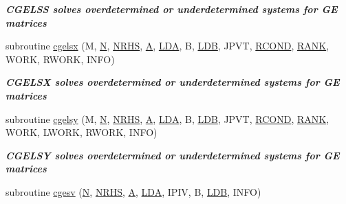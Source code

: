 \begin{DoxyCompactItemize}
\begin{DoxyCompactList}\small\item\em {\bfseries  C\+G\+E\+L\+S\+S solves overdetermined or underdetermined systems for G\+E matrices} \end{DoxyCompactList}\item 
subroutine \hyperlink{group__complexGEsolve_ga3c220cf53bd0e63da90633205a6b1db2}{cgelsx} (M, \hyperlink{polmisc_8c_a0240ac851181b84ac374872dc5434ee4}{N}, \hyperlink{example__user_8c_aa0138da002ce2a90360df2f521eb3198}{N\+R\+H\+S}, \hyperlink{classA}{A}, \hyperlink{example__user_8c_ae946da542ce0db94dced19b2ecefd1aa}{L\+D\+A}, B, \hyperlink{example__user_8c_a50e90a7104df172b5a89a06c47fcca04}{L\+D\+B}, J\+P\+V\+T, \hyperlink{superlu__enum__consts_8h_af00a42ecad444bbda75cde1b64bd7e72a9b5c151728d8512307565994c89919d5}{R\+C\+O\+N\+D}, \hyperlink{splinemodule_8c_a3a88bcc63386de30443dacede2e01847}{R\+A\+N\+K}, W\+O\+R\+K, R\+W\+O\+R\+K, I\+N\+F\+O)
\begin{DoxyCompactList}\small\item\em {\bfseries  C\+G\+E\+L\+S\+X solves overdetermined or underdetermined systems for G\+E matrices} \end{DoxyCompactList}\item 
subroutine \hyperlink{group__complexGEsolve_ga9c3fdd95b68447e92700dffb218fc9db}{cgelsy} (M, \hyperlink{polmisc_8c_a0240ac851181b84ac374872dc5434ee4}{N}, \hyperlink{example__user_8c_aa0138da002ce2a90360df2f521eb3198}{N\+R\+H\+S}, \hyperlink{classA}{A}, \hyperlink{example__user_8c_ae946da542ce0db94dced19b2ecefd1aa}{L\+D\+A}, B, \hyperlink{example__user_8c_a50e90a7104df172b5a89a06c47fcca04}{L\+D\+B}, J\+P\+V\+T, \hyperlink{superlu__enum__consts_8h_af00a42ecad444bbda75cde1b64bd7e72a9b5c151728d8512307565994c89919d5}{R\+C\+O\+N\+D}, \hyperlink{splinemodule_8c_a3a88bcc63386de30443dacede2e01847}{R\+A\+N\+K}, W\+O\+R\+K, L\+W\+O\+R\+K, R\+W\+O\+R\+K, I\+N\+F\+O)
\begin{DoxyCompactList}\small\item\em {\bfseries  C\+G\+E\+L\+S\+Y solves overdetermined or underdetermined systems for G\+E matrices} \end{DoxyCompactList}\item 
subroutine \hyperlink{group__complexGEsolve_gaa9e9aeee4df582bfee679de7defb8e68}{cgesv} (\hyperlink{polmisc_8c_a0240ac851181b84ac374872dc5434ee4}{N}, \hyperlink{example__user_8c_aa0138da002ce2a90360df2f521eb3198}{N\+R\+H\+S}, \hyperlink{classA}{A}, \hyperlink{example__user_8c_ae946da542ce0db94dced19b2ecefd1aa}{L\+D\+A}, I\+P\+I\+V, B, \hyperlink{example__user_8c_a50e90a7104df172b5a89a06c47fcca04}{L\+D\+B}, I\+N\+F\+O)

\end{DoxyCompactItemize}
